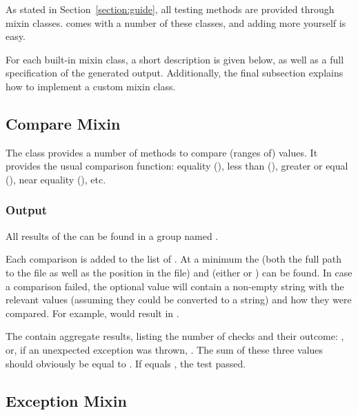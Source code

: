 As stated in Section~\ref{section:guide}, all testing methods are provided through mixin classes.  comes with a number of these classes, and adding more yourself is easy.

For each built-in mixin class, a short description is given below, as well as a full specification of the generated output. Additionally, the final subsection explains how to implement a custom mixin class.

\subsection{Compare Mixin}
\label{section:mixins:compare}

The  class provides a number of methods to compare (ranges of) values. It provides the usual comparison function: equality (), less than (), greater or equal (), near equality (), etc.

\subsubsection{Output}

All results of the  can be found in a group named .

Each comparison is added to the list of . At a minimum the  (both the full path to the file as well as the position in the file) and  (either  or ) can be found. In case a comparison failed, the optional  value will contain a non-empty string with the relevant values (assuming they could be converted to a string) and how they were compared. For example,  would result in .

The  contain aggregate results, listing the  number of checks and their outcome: ,  or, if an unexpected exception was thrown, . The sum of these three values should obviously be equal to . If  equals , the test passed.



\subsection{Exception Mixin}
\label{section:mixins:exception}

